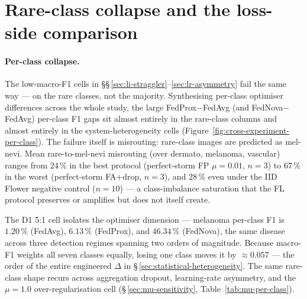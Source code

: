 \documentclass[11pt,a4paper]{report}
\begin{document}


\section{Rare-class collapse and the loss-side comparison}
\label{sec:rare-class-collapse}


\paragraph{Per-class collapse.}

The low-macro-F1 cells in \S\S\,\ref{sec:li-straggler}--\ref{sec:lr-asymmetry}
fail the same way --- on the rare classes, not the majority. Synthesising
per-class optimiser differences across the whole study, the large
FedProx$-$FedAvg (and FedNova$-$FedAvg) per-class F1 gaps sit almost entirely in
the rare-class columns and almost entirely in the system-heterogeneity cells
(Figure~\ref{fig:cross-experiment-per-class}). The failure itself is misrouting:
rare-class images are predicted as mel-nevi. Mean rare-to-mel-nevi
misrouting (over dermato, melanoma, vascular) ranges from $24\,\%$ in the
best protocol (perfect-storm FP $\mu = 0.01$, $n=3$) to $67\,\%$ in the
worst (perfect-storm FA+drop, $n=3$), and $28\,\%$ even under the IID
Flower negative control ($n=10$) --- a class-imbalance saturation that the
FL protocol preserves or amplifies but does not itself create.

The D1 5:1 cell isolates the optimiser dimension --- melanoma per-class F1 is
$1.20\,\%$ (FedAvg), $6.13\,\%$ (FedProx), and $46.34\,\%$ (FedNova), the same
disease across three detection regimes spanning two orders of magnitude. Because
macro-F1 weights all seven classes equally, losing one class moves it by
$\approx 0.057$ --- the order of the entire engineered $\Delta$ in
\S\,\ref{sec:statistical-heterogeneity}. The same rare-class shape recurs across
aggregation dropout, learning-rate asymmetry, and the $\mu = 1.0$
over-regularisation cell (\S\,\ref{sec:mu-sensitivity}, Table~\ref{tab:mu-per-class}).
\end{document}
